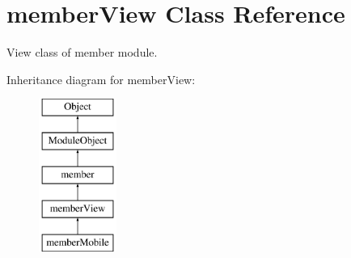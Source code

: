 \hypertarget{classmemberView}{}\section{member\+View Class Reference}
\label{classmemberView}


View class of member module.  


Inheritance diagram for member\+View\+:\begin{figure}[H]
\begin{center}
\leavevmode
\includegraphics[height=5.000000cm]{classmemberView}
\end{center}
\end{figure}
